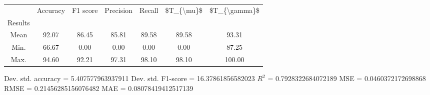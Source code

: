 \begin{tabular}{|c|c|c|c|c|c|c|}
\toprule
{} &  Accuracy &  F1 score &  Precision &  Recall &  \$T\_\{\textbackslash mu\}\$ &  \$T\_\{\textbackslash gamma\}\$ \\
Results &           &           &            &         &            &               \\
\hline
Mean    &     92.07 &     86.45 &      85.81 &   89.58 &      89.58 &         93.31 \\
Min.    &     66.67 &      0.00 &       0.00 &    0.00 &       0.00 &         87.25 \\
Max.    &     94.60 &     92.21 &      97.31 &   98.10 &      98.10 &        100.00 \\
\bottomrule
\end{tabular}

 Dev. std. accuracy = 5.407577963937911
 Dev. std. F1-score = 16.37861856582023
 $R^2$ = 0.7928322684072189
 MSE = 0.0460372172698868
 RMSE = 0.21456285156076482
 MAE = 0.08078419412517139